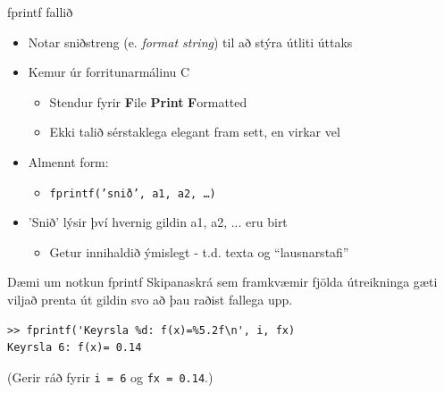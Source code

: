 \documentclass{beamer}
\begin{document}
\begin{frame}{fprintf fallið}
\begin{itemize}
 \item Notar sniðstreng (e. \emph{format string}) til að stýra útliti úttaks
 \item Kemur úr forritunarmálinu C
 \begin{itemize}
  \item Stendur fyrir \textbf{F}ile \textbf{Print} \textbf{F}ormatted
  \item Ekki talið sérstaklega elegant fram sett, en virkar vel
 \end{itemize}
 \item Almennt form:
 \begin{itemize}
  \item \texttt{fprintf('snið', a1, a2, \ldots )}
 \end{itemize}
 \item 'Snið' lýsir því hvernig gildin a1, a2, ... eru birt
 \begin{itemize}
  \item Getur innihaldið ýmislegt - t.d. texta og ``lausnarstafi''
 \end{itemize}

\end{itemize}
\end{frame}

\begin{frame}[fragile]{Dæmi um notkun fprintf}
Skipanaskrá sem framkvæmir fjölda útreikninga gæti viljað prenta út gildin svo að þau raðist fallega upp.

\begin{verbatim}
>> fprintf('Keyrsla %d: f(x)=%5.2f\n', i, fx)
Keyrsla 6: f(x)= 0.14
\end{verbatim}

(Gerir ráð fyrir \texttt{i = 6} og \texttt{fx = 0.14}.)

\end{frame}
\end{document}
